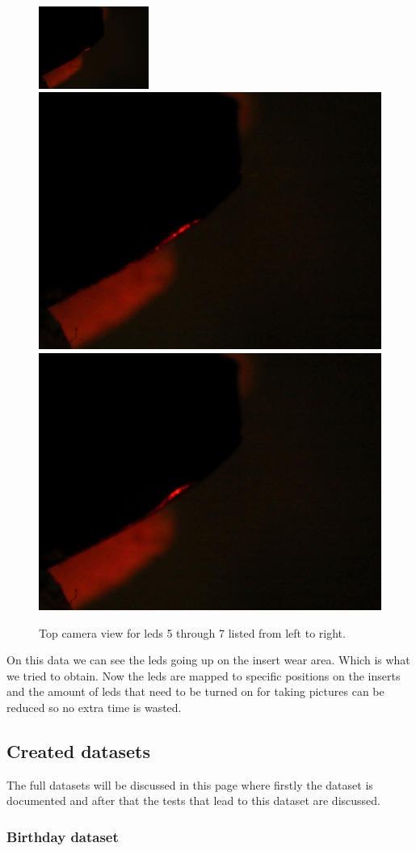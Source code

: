 \begin{figure}
\includegraphics[width=0.32\textwidth, keepaspectratio=true]{./fig/Vision/Dataset/automated_datasets/1_check_camera_position/2_camera_position_top/p3_l5.png}\hfill
\includegraphics[width=.32\textwidth, keepaspectratio=true]{./fig/Vision/Dataset/automated_datasets/1_check_camera_position/2_camera_position_top/p3_l6.png}\hfill
\includegraphics[width=.32\textwidth, keepaspectratio=true]{./fig/Vision/Dataset/automated_datasets/1_check_camera_position/2_camera_position_top/p3_l7.png}
\caption{Top camera view for leds 5 through 7 listed from left to right.}
\label{fig:dataset:cameraposition:top:results}
\end{figure}

On this data we can see the leds going up on the insert wear area. Which is what we tried to obtain. Now the leds are mapped to specific positions on the inserts and the amount of leds that need to be turned on for taking pictures can be reduced so no extra time is wasted. 

		\subsection{Created datasets}

The full datasets will be discussed in this page where firstly the dataset is documented and after that the tests that lead to this dataset are discussed.

\subsubsection{Birthday dataset}

